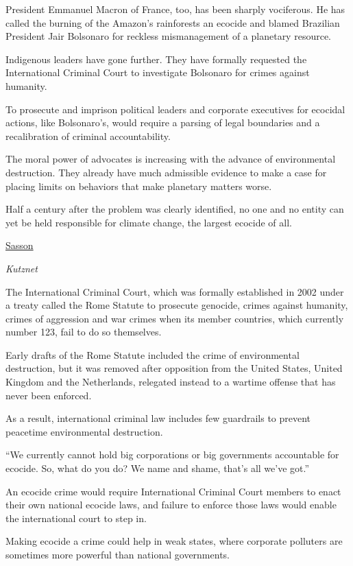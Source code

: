 \documentclass[
]{book}
\begin{document}
President Emmanuel Macron of France, too, has been sharply vociferous.
He has called the burning of the Amazon's rainforests an ecocide and
blamed Brazilian President Jair Bolsonaro for
reckless mismanagement of a planetary resource.

Indigenous leaders have gone further.
They have formally requested the International Criminal Court to investigate Bolsonaro
for crimes against humanity.

To prosecute and imprison political leaders and corporate executives for ecocidal actions,
like Bolsonaro's, would require a parsing of legal boundaries and
a recalibration of criminal accountability.

The moral power of advocates is increasing with the advance of environmental destruction.
They already have much admissible evidence to make a case for
placing limits on behaviors that make planetary matters worse.

Half a century after the problem was clearly identified,
no one and no entity can yet be held responsible for climate change,
the largest ecocide of all.

\href{https://insideclimatenews.org/news/07042021/ecocide-should-destruction-of-the-planet-be-a-crime/}{Sasson}

\emph{Kutznet}

The International Criminal Court, which was formally established in 2002 under a treaty called the Rome Statute to prosecute genocide, crimes against humanity, crimes of aggression and war crimes when its member countries, which currently number 123, fail to do so themselves.

Early drafts of the Rome Statute included the crime of environmental destruction, but it was removed after opposition from the United States, United Kingdom and the Netherlands, relegated instead to a wartime offense that has never been enforced.

As a result, international criminal law includes few guardrails to prevent peacetime environmental destruction.

``We currently cannot hold big corporations or big governments accountable for ecocide. So, what do you do? We name and shame, that's all we've got.''

An ecocide crime would require International Criminal Court members to enact their own national ecocide laws, and failure to enforce those laws would enable the international court to step in.

Making ecocide a crime could help in weak states, where corporate polluters are sometimes more powerful than national governments.
\end{document}
